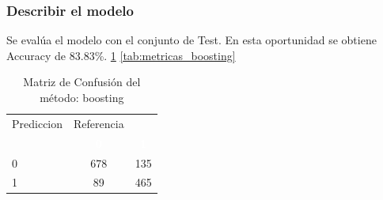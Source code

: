 \subsubsection{Describir el modelo}

Se evalúa el modelo con el conjunto de Test. En esta oportunidad se obtiene  Accuracy de 83.83\%. \ref{tab:MatrizConf_boosting} \ref{tab:metricas_boosting}

\begin{table}[!h]
	
	\caption{\label{tab:MatrizConf_boosting}Matriz de Confusión del método: boosting }
	\centering
	\begin{tabular}[t]{lcc}
		\toprule
		\multicolumn{1}{c}{Prediccion} & \multicolumn{1}{c}{Referencia} & \multicolumn{1}{c}{ } \\
		\cmidrule(l{3pt}r{3pt}){1-1} \cmidrule(l{3pt}r{3pt}){2-2}
		\rowcolor{black}  \multicolumn{1}{c}{\textcolor{white}{\textbf{ }}} & \multicolumn{1}{c}{\textcolor{white}{\textbf{0}}} & \multicolumn{1}{c}{\textcolor{white}{\textbf{1}}}\\
		\midrule
		\rowcolor{gray!6}  0 & 678 & 135\\
		1 & 89 & 465\\
		\bottomrule
	\end{tabular}
\end{table}

